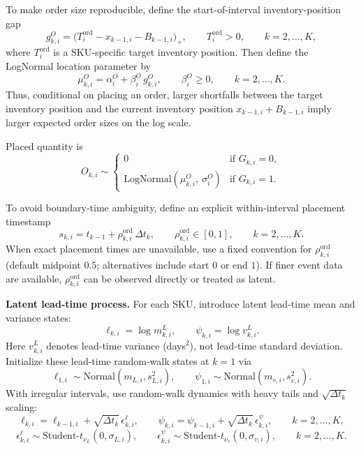 \documentclass[11pt]{article}
\begin{document}
To make order size reproducible, define the start-of-interval inventory-position gap
\[
  g^{O}_{k,i}=\bigl(T^{\mathrm{ord}}_i-x_{k-1,i}-B_{k-1,i}\bigr)_+,\qquad T^{\mathrm{ord}}_i>0,\qquad k=2,\dots,K,
\]
where $T^{\mathrm{ord}}_i$ is a SKU-specific target inventory position.
Then define the LogNormal location parameter by
\[
  \mu^{O}_{k,i}=\alpha^{O}_i+\beta^{O}_i\,g^{O}_{k,i},\qquad \beta^{O}_i\ge 0,\qquad k=2,\dots,K.
\]
Thus, conditional on placing an order, larger shortfalls between the target inventory position and the current inventory position $x_{k-1,i}+B_{k-1,i}$ imply larger expected order sizes on the log scale.

Placed quantity is
\[
  O_{k,i} \sim
  \begin{cases}
    0 & \text{if } G_{k,i}=0,\\
    \text{LogNormal}(\mu^{O}_{k,i},\ \sigma^{O}_i) & \text{if } G_{k,i}=1.
  \end{cases}
\]

To avoid boundary-time ambiguity, define an explicit within-interval placement timestamp
\[
  s_{k,i}=t_{k-1}+\rho^{\mathrm{ord}}_{k,i}\,\Delta t_k,\qquad \rho^{\mathrm{ord}}_{k,i}\in[0,1],\qquad k=2,\dots,K.
\]
When exact placement times are unavailable, use a fixed convention for $\rho^{\mathrm{ord}}_{k,i}$ (default midpoint $0.5$; alternatives include start $0$ or end $1$). If finer event data are available, $\rho^{\mathrm{ord}}_{k,i}$ can be observed directly or treated as latent.

\textbf{Latent lead-time process.} For each SKU, introduce latent lead-time mean and variance states:
\[
  \ell_{k,i}=\log m^L_{k,i},\qquad \psi_{k,i}=\log v^L_{k,i}.
\]
Here $v^L_{k,i}$ denotes lead-time variance (days$^2$), not lead-time standard deviation.
Initialize these lead-time random-walk states at $k=1$ via
\[
  \ell_{1,i}\sim\text{Normal}(m_{L,i},s_{L,i}^2),\qquad
  \psi_{1,i}\sim\text{Normal}(m_{v,i},s_{v,i}^2).
\]
With irregular intervals, use random-walk dynamics with heavy tails and $\sqrt{\Delta t_k}$ scaling:
\[
  \ell_{k,i}=\ell_{k-1,i}+\sqrt{\Delta t_k}\,\epsilon^{\ell}_{k,i},\qquad
  \psi_{k,i}=\psi_{k-1,i}+\sqrt{\Delta t_k}\,\epsilon^{\psi}_{k,i},\qquad k=2,\dots,K,
\]
\[
  \epsilon^{\ell}_{k,i}\sim\text{Student-}t_{\nu_L}(0,\sigma_{L,i}),\qquad
  \epsilon^{\psi}_{k,i}\sim\text{Student-}t_{\nu_v}(0,\sigma_{v,i}),\qquad k=2,\dots,K.
\]
\end{document}
